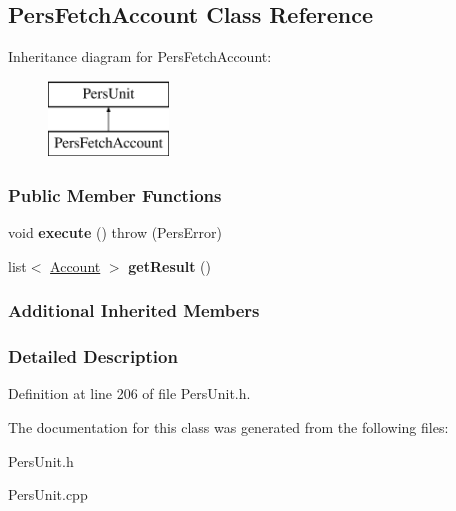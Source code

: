 \hypertarget{classPersFetchAccount}{\subsection{Pers\-Fetch\-Account Class Reference}
\label{df/d2b/classPersFetchAccount}
}
Inheritance diagram for Pers\-Fetch\-Account\-:\begin{figure}[H]
\begin{center}
\leavevmode
\includegraphics[height=2.000000cm]{df/d2b/classPersFetchAccount}
\end{center}
\end{figure}
\subsubsection*{Public Member Functions}
\begin{DoxyCompactItemize}
\item 
\hypertarget{classPersFetchAccount_a8fb6e7e8a65bebe14be61fb1a3c7f471}{void {\bfseries execute} ()  throw (\-Pers\-Error)}\label{df/d2b/classPersFetchAccount_a8fb6e7e8a65bebe14be61fb1a3c7f471}

\item 
\hypertarget{classPersFetchAccount_aa3e5a46fe7c8a7a00b03a45c3c8defb8}{list$<$ \hyperlink{classAccount}{Account} $>$ {\bfseries get\-Result} ()}\label{df/d2b/classPersFetchAccount_aa3e5a46fe7c8a7a00b03a45c3c8defb8}

\end{DoxyCompactItemize}
\subsubsection*{Additional Inherited Members}


\subsubsection{Detailed Description}


Definition at line 206 of file Pers\-Unit.\-h.



The documentation for this class was generated from the following files\-:\begin{DoxyCompactItemize}
\item 
Pers\-Unit.\-h\item 
Pers\-Unit.\-cpp\end{DoxyCompactItemize}
